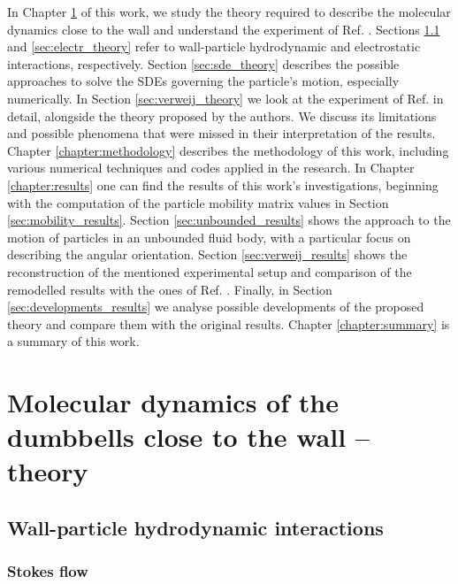 \documentclass{master_thesis}
\begin{document}
In Chapter \ref{chapter:theory} of this work, we study the theory required to describe the molecular dynamics close to the wall and understand the experiment of Ref. \cite{verweij2021}. Sections \ref{sec:hydrodynamics_theory} and \ref{sec:electr_theory} refer to wall-particle hydrodynamic and electrostatic interactions, respectively. Section \ref{sec:sde_theory} describes the possible approaches to solve the SDEs governing the particle's motion, especially numerically. In Section \ref{sec:verweij_theory} we look at the experiment of Ref. \cite{verweij2021} in detail, alongside the theory proposed by the authors. We discuss its limitations and possible phenomena that were missed in their interpretation of the results. Chapter \ref{chapter:methodology} describes the methodology of this work, including various numerical techniques and codes applied in the research. In Chapter \ref{chapter:results} one can find the results of this work's investigations, beginning with the computation of the particle mobility matrix values in Section \ref{sec:mobility_results}. Section \ref{sec:unbounded_results} shows the approach to the motion of particles in an unbounded fluid body, with a particular focus on describing the angular orientation. Section \ref{sec:verweij_results} shows the reconstruction of the mentioned experimental setup and comparison of the remodelled results with the ones of Ref. \cite{verweij2021}. Finally, in Section \ref{sec:developments_results} we analyse possible developments of the proposed theory and compare them with the original results. Chapter \ref{chapter:summary} is a summary of this work.

\chapter{Molecular dynamics of the dumbbells close to the wall -- theory} \label{chapter:theory}

\section{Wall-particle hydrodynamic interactions} \label{sec:hydrodynamics_theory}

\subsection{Stokes flow}
\end{document}
